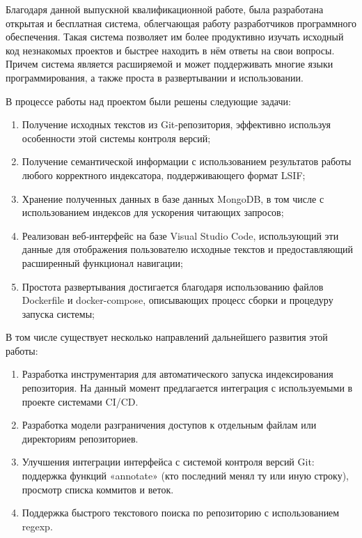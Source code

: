 \label{chap:final}

Благодаря данной выпускной квалификационной работе, была разработана открытая и бесплатная система, облегчающая работу разработчиков программного обеспечения. Такая система позволяет им более продуктивно изучать исходный код незнакомых проектов и быстрее находить в нём ответы на свои вопросы. Причем система является расширяемой и может поддерживать многие языки программирования, а также проста в развертывании и использовании. 
\medskip

В процессе работы над проектом были решены следующие задачи:

\begin{enumerate}
    \item Получение исходных текстов из Git-репозитория, эффективно используя особенности этой системы контроля версий;
    \item Получение семантической информации с использованием результатов работы любого корректного индексатора, поддерживающего формат LSIF;
    \item Хранение полученных данных в базе данных MongoDB, в том числе с использованием индексов для ускорения читающих запросов;
    \item Реализован веб-интерфейс на базе Visual Studio Code, использующий эти данные для отображения пользователю исходные текстов и предоставляющий расширенный функционал навигации;
    \item Простота развертывания достигается благодаря использованию файлов Dockerfile и docker-compose, описывающих процесс сборки и процедуру запуска системы;
\end{enumerate}

\medskip

В том числе существует несколько направлений дальнейшего развития этой работы:
\begin{enumerate}
    \item Разработка инструментария для автоматического запуска индексирования репозитория. На данный момент предлагается интеграция с используемыми в проекте системами CI/CD.
    \item Разработка модели разграничения доступов к отдельным файлам или директориям репозиториев.
    \item Улучшения интеграции интерфейса с системой контроля версий Git: поддержка функций «annotate» (кто последний менял ту или иную строку), просмотр списка коммитов и веток.
    \item Поддержка быстрого текстового поиска по репозиторию с использованием regexp.
\end{enumerate}

\clearpage